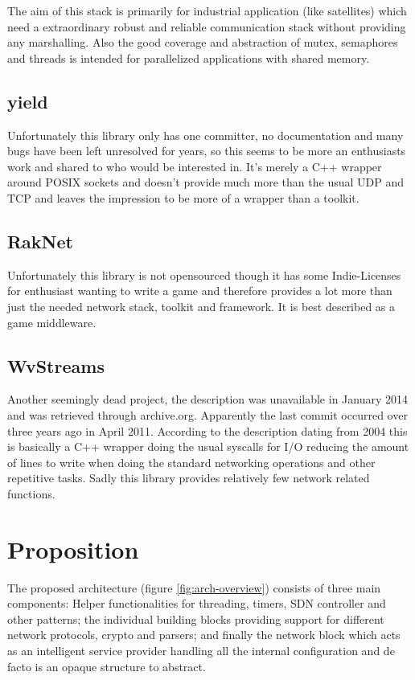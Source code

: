 \documentclass[twocolumn,english]{IEEEtran}
\theoremstyle{plain}
\theoremstyle{plain}
\begin{document}
The aim of this stack is primarily for industrial application (like
satellites) which need a extraordinary robust and reliable communication stack
without providing any marshalling. Also the good coverage and abstraction of
mutex, semaphores and threads is intended for parallelized applications with
shared memory.

\subsection{yield\cite{yield}} 
Unfortunately this library only has one committer, no documentation and many
bugs have been left unresolved for years, so this seems to be more an
enthusiasts work and shared to who would be interested in. It's merely a C++
wrapper around POSIX sockets and doesn't provide much more than the usual UDP
and TCP and leaves the impression to be more of a wrapper than a toolkit.

\subsection{RakNet\cite{raknet}}
Unfortunately this library is not opensourced though it has some
Indie-Licenses for enthusiast wanting to write a game and therefore provides a
lot more than just the needed network stack, toolkit and framework. It is best
described as a game middleware.

\subsection{WvStreams\cite{wvstreams}}
Another seemingly dead project, the description was unavailable in January
2014 and was retrieved through archive.org. Apparently the last commit
occurred over three years ago in April 2011. According to the description
dating from 2004 this is basically a C++ wrapper doing the usual syscalls for
I/O reducing the amount of lines to write when doing the standard networking
operations and other repetitive tasks. Sadly this library provides relatively
few network related functions.

\section{Proposition}

The proposed architecture (figure \ref{fig:arch-overview}) consists of three
main components: Helper functionalities for threading, timers, SDN controller
and other patterns; the individual building blocks providing support for
different network protocols, crypto and parsers; and finally the network block
which acts as an intelligent service provider handling all the internal
configuration and de facto is an opaque structure to abstract.
\end{document}
